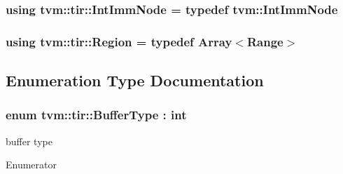 \subsubsection[{\texorpdfstring{Int\+Imm\+Node}{IntImmNode}}]{\setlength{\rightskip}{0pt plus 5cm}using {\bf tvm\+::tir\+::\+Int\+Imm\+Node} = typedef {\bf tvm\+::\+Int\+Imm\+Node}}\hypertarget{namespacetvm_1_1tir_ae8c7db788e840dc1c2ed1f365d5ea829}{}\label{namespacetvm_1_1tir_ae8c7db788e840dc1c2ed1f365d5ea829}
\subsubsection[{\texorpdfstring{Region}{Region}}]{\setlength{\rightskip}{0pt plus 5cm}using {\bf tvm\+::tir\+::\+Region} = typedef {\bf Array}$<${\bf Range}$>$}\hypertarget{namespacetvm_1_1tir_a8277e2a3d81a80a4776705673df51e0a}{}\label{namespacetvm_1_1tir_a8277e2a3d81a80a4776705673df51e0a}


\subsection{Enumeration Type Documentation}
\subsubsection[{\texorpdfstring{Buffer\+Type}{BufferType}}]{\setlength{\rightskip}{0pt plus 5cm}enum {\bf tvm\+::tir\+::\+Buffer\+Type} \+: int}\hypertarget{namespacetvm_1_1tir_a9ac05a14db42ca73da1d3945e7ce2fd1}{}\label{namespacetvm_1_1tir_a9ac05a14db42ca73da1d3945e7ce2fd1}


buffer type 

\begin{Desc}
\item[Enumerator]\par
\begin{description}
\item[{\em 
k\+Default\hypertarget{namespacetvm_1_1tir_a9ac05a14db42ca73da1d3945e7ce2fd1a4500370408bf0077c86a795cbe9dbf39}{}\label{namespacetvm_1_1tir_a9ac05a14db42ca73da1d3945e7ce2fd1a4500370408bf0077c86a795cbe9dbf39}
}]\item[{\em 
k\+Auto\+Broadcast\hypertarget{namespacetvm_1_1tir_a9ac05a14db42ca73da1d3945e7ce2fd1a08cd53d61aa635081a2f7a0597025663}{}\label{namespacetvm_1_1tir_a9ac05a14db42ca73da1d3945e7ce2fd1a08cd53d61aa635081a2f7a0597025663}
}]\end{description}
\end{Desc}
